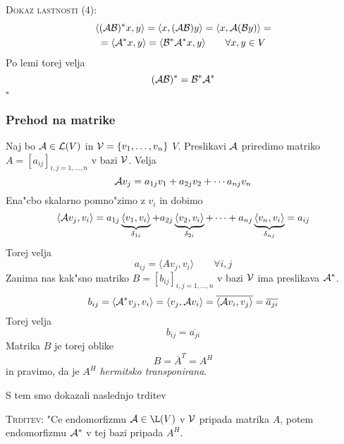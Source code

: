 \textsc{Dokaz lastnosti (4):}
\begin{multline*}
\langle (\mathcal{A} \mathcal{B})^* x, y \rangle = \langle x, (\mathcal{A} \mathcal{B}) y \rangle = \langle x, \mathcal{A} (\mathcal{B} y) \rangle = \\
= \langle \mathcal{A}^* x, y \rangle = \langle \mathcal{B}^* \mathcal{A}^* x, y \rangle \qquad \forall x, y \in V
\end{multline*}
Po lemi torej velja
\begin{equation*}
(\mathcal{A} \mathcal{B})^* = \mathcal{B}^* \mathcal{A}^*
\end{equation*}
\hfill $\square$

\subsubsection{Prehod na matrike}
Naj bo $\mathcal{A} \in \mathcal{L}(V)$ in $\mathcal{V} = \{ v_1, \ldots, v_n \}$ \ONB $V$. Preslikavi $\mathcal{A}$ priredimo matriko $A = [a_{ij}]_{i, j = 1, \ldots, n}$ v bazi $\mathcal{V}$. Velja
\begin{equation*}
\mathcal{A} v_j = a_{1j} v_1 + a_{2j} v_2 + \cdots a_{nj} v_n
\end{equation*}
Ena"cbo skalarno pomno"zimo z $v_i$ in dobimo
\begin{equation*}
\langle \mathcal{A} v_j, v_i \rangle = a_{1j} \underbrace{\langle v_1, v_i \rangle}_{\delta_{1i}} + a_{2j} \underbrace{\langle v_2, v_i \rangle}_{\delta_{2i}} + \cdots + a_{nj} \underbrace{\langle v_n, v_i \rangle}_{\delta_{nj}} = a_{ij}
\end{equation*}
Torej velja
\begin{equation*}
a_{ij} = \langle A v_j, v_i \rangle \qquad \forall i, j
\end{equation*}
Zanima nas kak"sno matriko $B = [b_{ij}]_{i, j = 1, \ldots, n}$ v bazi $\mathcal{V}$ ima preslikava $\mathcal{A}^*$.
\begin{equation*}
b_{ij} = \langle \mathcal{A}^* v_j, v_i \rangle = \langle v_j, \mathcal{A} v_i \rangle = \overline{\langle \mathcal{A} v_i, v_j \rangle} = \overline{a_{ji}}
\end{equation*}
Torej velja
\begin{equation*}
b_{ij} = \overline{a_{ji}}
\end{equation*}
Matrika $B$ je torej oblike
\begin{equation*}
B = \overline{A}^T = A^H
\end{equation*}
in pravimo, da je $A^H$ \emph{hermitsko transponirana}.

S tem smo dokazali naslednjo trditev

\textsc{Trditev:} "Ce endomorfizmu $\A\in \L(V)$ v \ONB $\mathcal{V}$ pripada matrika $A$, potem endomorfizmu $\mathcal{A}^*$ v tej bazi pripada $A^H$.



